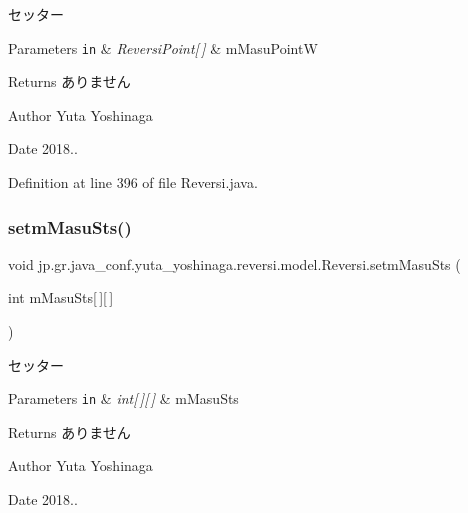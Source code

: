 セッター 


\begin{DoxyParams}[1]{Parameters}
\mbox{\tt in}  & {\em Reversi\+Point\mbox{[}$\,$\mbox{]}} & m\+Masu\+PointW \\
\hline
\end{DoxyParams}
\begin{DoxyReturn}{Returns}
ありません 
\end{DoxyReturn}
\begin{DoxyAuthor}{Author}
Yuta Yoshinaga 
\end{DoxyAuthor}
\begin{DoxyDate}{Date}
2018.. 
\end{DoxyDate}


Definition at line 396 of file Reversi.\+java.

\mbox{\label{classjp_1_1gr_1_1java__conf_1_1yuta__yoshinaga_1_1reversi_1_1model_1_1_reversi_a412ca568b8d8d1aeee39c22993cfcefd}} 
\subsubsection{\texorpdfstring{setm\+Masu\+Sts()}{setmMasuSts()}}
{\footnotesize\ttfamily void jp.\+gr.\+java\+\_\+conf.\+yuta\+\_\+yoshinaga.\+reversi.\+model.\+Reversi.\+setm\+Masu\+Sts (\begin{DoxyParamCaption}\item[{int}]{m\+Masu\+Sts\mbox{[}$\,$\mbox{]}\mbox{[}$\,$\mbox{]} }\end{DoxyParamCaption})}



セッター 


\begin{DoxyParams}[1]{Parameters}
\mbox{\tt in}  & {\em int\mbox{[}$\,$\mbox{]}\mbox{[}$\,$\mbox{]}} & m\+Masu\+Sts \\
\hline
\end{DoxyParams}
\begin{DoxyReturn}{Returns}
ありません 
\end{DoxyReturn}
\begin{DoxyAuthor}{Author}
Yuta Yoshinaga 
\end{DoxyAuthor}
\begin{DoxyDate}{Date}
2018.. 
\end{DoxyDate}


